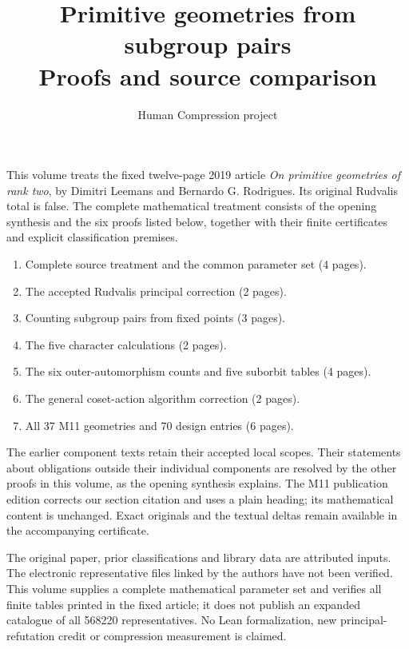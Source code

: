 \documentclass[11pt,a4paper]{article}
\title{Primitive geometries from subgroup pairs\\Proofs and source comparison}
\author{Human Compression project}\date{}
\begin{document}
\maketitle
This volume treats the fixed twelve-page 2019 article
\emph{On primitive geometries of rank two}, by Dimitri Leemans and
Bernardo G. Rodrigues. Its original Rudvalis total is false. The complete
mathematical treatment consists of the opening synthesis and the six
proofs listed below, together with their finite certificates and explicit
classification premises.

\begin{enumerate}
\item Complete source treatment and the common parameter set (4 pages).
\item The accepted Rudvalis principal correction (2 pages).
\item Counting subgroup pairs from fixed points (3 pages).
\item The five character calculations (2 pages).
\item The six outer-automorphism counts and five suborbit tables (4 pages).
\item The general coset-action algorithm correction (2 pages).
\item All 37 M11 geometries and 70 design entries (6 pages).
\end{enumerate}

The earlier component texts retain their accepted local scopes. Their
statements about obligations outside their individual components are
resolved by the other proofs in this volume, as the opening synthesis
explains. The M11 publication edition corrects our section citation and
uses a plain heading; its mathematical content is unchanged. Exact
originals and the textual deltas remain available in the accompanying
certificate.

The original paper, prior classifications and library data are attributed
inputs. The electronic representative files linked by the authors have
not been verified. This volume supplies a complete mathematical parameter
set and verifies all finite tables printed in the fixed article; it does
not publish an expanded catalogue of all 568220 representatives. No Lean
formalization, new principal-refutation credit or compression measurement
is claimed.







\end{document}
